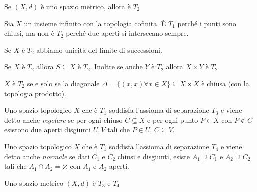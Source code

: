 \begin{example}
    Se \((X, d)\) è uno spazio metrico, allora è \(T_{2}\) 
\end{example}

\begin{example}
    Sia \(X\) un insieme infinito con la topologia cofinita. È \(T_{1}\) perché
    i punti sono chiusi, ma non è \(T_{2}\) perché due aperti si intersecano
    sempre.
\end{example}

\begin{proposition}
    Se \(X\) è \(T_{2}\) abbiamo unicità del limite di successioni.
\end{proposition}

\begin{proposition}
    Se \(X\) è \(T_{2}\) allora \(S \subseteq X \) è \(T_{2}\). Inoltre se anche
    \(Y\) è \(T_{2}\) allora \(X \times Y\) è \(T_{2}\) 
\end{proposition}

\begin{proposition}
    \(X\) è \(T_{2}\) se e solo se la diagonale \(\Delta = \{(x, x) \forall x
    \in X\} \subseteq X \times X \) è chiusa (con la topologia prodotto).
\end{proposition}

\begin{definition}
    Uno spazio topologico \(X\) che è \(T_{1}\)  soddisfa l'assioma di
    separazione \(T_3\) e
    viene detto anche \emph{regolare} se per ogni chiuso \(C \subseteq X\) e per ogni punto \(P \in  X\)
    con \(P \not\in  C\) esistono due aperti disgiunti \(U, V\) tali che \(P \in
    U\), \(C \subseteq V\).
\end{definition}
\begin{definition}
    Uno spazio topologico \(X\) che è \(T_{1}\) soddisfa l'assioma di
    separazione \(T_{4}\) e viene detto anche \emph{normale} se dati \(C_{1}\) e \(C_{2}\) chiusi e disgiunti,
    esiste \(A_{1} \supseteq C_{1}  \) e \(A_{2} \supseteq C_{2} \) tali che
    \(A_{1} \cap A_{2} = \varnothing\) con \(A_{1}\) e \(A_{2}\) aperti.
\end{definition}

\begin{example}
    Uno spazio metrico \((X, d)\) è \(T_{3}\) e \(T_{4}\) 
\end{example}

